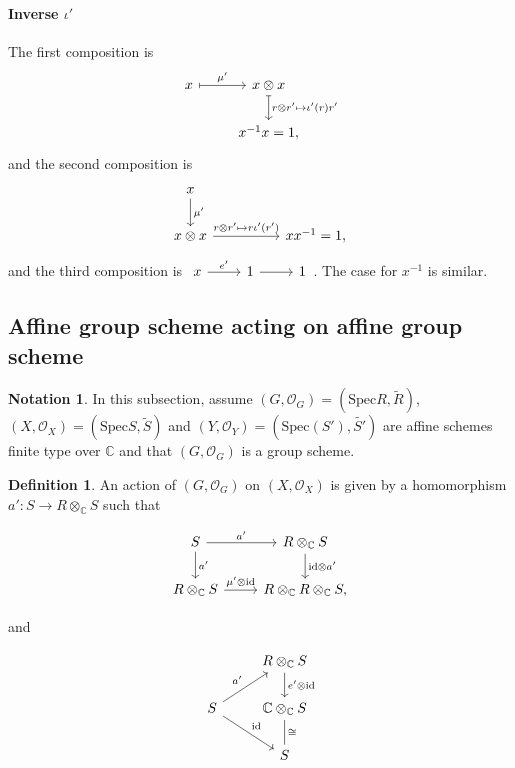\documentclass{article}
\theoremstyle{definition}
\newtheorem{definition}{Definition}
\newtheorem*{notation}{Notation}
\newcommand{\Spec}{\mathrm{Spec}}
\newcommand{\ssheaf}[1]{\widetilde{#1}}
\newcommand{\tensorC}[2]{#1\otimes_\mathbb C #2}
\newcommand{\tensor}[2]{#1\otimes#2}
\newcommand{\so}[1]{(#1, \mathcal O_{#1})}
\newcommand{\id}{\mathrm{id}}
\newcommand{\sr}[1]{(\Spec{#1},\ssheaf{#1})}
\newcommand{\srb}[1]{(\Spec{(#1)},\ssheaf{#1})}
\begin{document}
\paragraph{Inverse $\iota'$} The first composition is
$$
\begin{tikzcd}
  x \arrow[r, mapsto, "\mu'"] & {\tensor x x} \arrow[d, mapsto, "{\tensor{r}{r'}\mapsto\iota'(r)r'}"]\\
  & {x^{-1}x=1}, 
\end{tikzcd}
$$ and the second composition is
$$
\begin{tikzcd}[column sep=huge]
  x \arrow[d, "\mu'"] \\
  {\tensor x x} \arrow[r, "{\tensor{r}{r'}\mapsto r\iota'(r')}"] & x x^{-1}=1,
\end{tikzcd}
$$ and the third composition is $
\begin{tikzcd}
  x \arrow[r, "e'"] & 1 \arrow[r] & 1
\end{tikzcd}
$. The case for $x^{-1}$ is similar.

\subsection{Affine group scheme acting on affine group scheme}
\begin{notation}
In this subsection, assume $\so G = \sr R$, $\so X=\sr S$ and $\so Y=\srb{S'}$ are affine schemes finite type over $\mathbb C$ and that $\so G$ is a group scheme.
\end{notation}

\begin{definition}
  An action of $\so G$ on $\so X$ is given by a homomorphism $a' : S \to \tensorC R S$ such that
\newline
\noindent  \begin{minipage}{0.45\linewidth}
    \begin{equation*}
      \begin{tikzcd}
        S \arrow[r, "a'"]\arrow[d, "a'"] & \tensorC R S\arrow[d, "{\tensor\id{a'}}"] \\
        \tensorC R S \arrow[r, "{\tensor{\mu'}\id}"] & \tensorC R{\tensorC R S},
      \end{tikzcd}
    \end{equation*}
  \end{minipage} and
  \noindent\begin{minipage}{0.45\linewidth}
    \begin{equation*}
      \begin{tikzcd}
        & \tensorC R S \arrow[d, "{\tensor{e'}\id}"]\\
        S \arrow[ru, "a'"] \arrow[rd, "\id"] & \tensorC{\mathbb C} S\arrow[d, no head, "\cong"]\\
        & S
      \end{tikzcd}
    \end{equation*}
  \end{minipage}
\end{definition}
\end{document}
